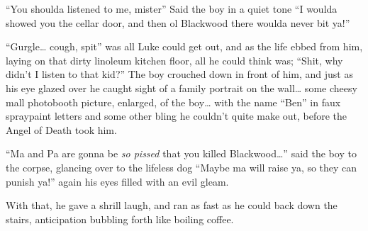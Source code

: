 ``You shoulda listened to me, mister'' Said the boy in a quiet tone
``I woulda showed you the cellar door, and then ol Blackwood there
woulda never bit ya!''

``Gurgle\ldots{} cough, spit'' was all Luke could get out, and as the life
ebbed from him, laying on that dirty linoleum kitchen floor, all he
could think was; ``Shit, why didn't I listen to that kid?'' The boy
crouched down in front of him, and just as his eye glazed over he
caught sight of a family portrait on the wall{\ldots} some cheesy mall
photobooth picture, enlarged, of the boy{\ldots} with the name ``Ben'' in
faux spraypaint letters and some other bling he couldn't quite make
out, before the Angel of Death took him.

``Ma and Pa are gonna be {\em so pissed} that you killed
Blackwood{\ldots}'' said the boy to the corpse, glancing over to the
lifeless dog ``Maybe ma will raise ya, so they can punish ya!'' again
his eyes filled with an evil gleam.

With that, he gave a shrill laugh, and ran as fast as he could back
down the stairs, anticipation bubbling forth like boiling coffee. 

 



